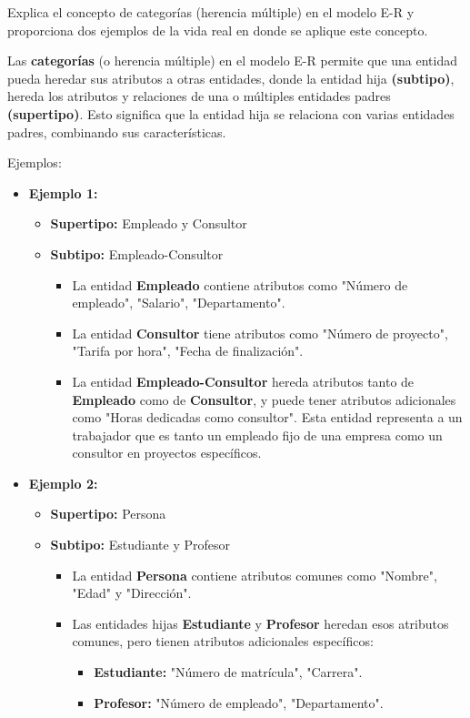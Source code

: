 
Explica el concepto de categorías (herencia múltiple) en el modelo E-R y proporciona dos ejemplos de la vida real en donde se aplique este concepto.

Las \textbf{categorías} (o herencia múltiple) en el modelo E-R permite que una entidad pueda heredar sus atributos a otras entidades, donde la entidad hija \textbf{(subtipo)}, hereda los atributos y relaciones de una o múltiples entidades padres \textbf{(supertipo)}. Esto significa que la entidad hija se relaciona con varias entidades padres, combinando sus características.

Ejemplos:
\begin{itemize}
    \item \textbf{Ejemplo 1:}
    \begin{itemize}
        \item \textbf{Supertipo: } Empleado y Consultor
        \item \textbf{Subtipo:} Empleado-Consultor
        
    \begin{itemize}
        \item La entidad \textbf{Empleado} contiene atributos como "Número de empleado", "Salario", "Departamento".
        \item La entidad \textbf{Consultor} tiene atributos como "Número de proyecto", "Tarifa por hora", "Fecha de finalización".
        \item La entidad \textbf{Empleado-Consultor} hereda atributos tanto de \textbf{Empleado} como de \textbf{Consultor}, y puede tener atributos adicionales como "Horas dedicadas como consultor". Esta entidad representa a un trabajador que es tanto un empleado fijo de una empresa como un consultor en proyectos específicos.
    \end{itemize}
    \end{itemize}

    \item \textbf{Ejemplo 2:}
    \begin{itemize}
         \item \textbf{Supertipo:} Persona
        \item \textbf{Subtipo:} Estudiante y Profesor
        
    \begin{itemize}
        \item La entidad \textbf{Persona} contiene atributos comunes como "Nombre", "Edad" y "Dirección".
        \item Las entidades hijas \textbf{Estudiante} y \textbf{Profesor} heredan esos atributos comunes, pero tienen atributos adicionales específicos:
        \begin{itemize}
            \item \textbf{Estudiante:} "Número de matrícula", "Carrera".
            \item \textbf{Profesor:} "Número de empleado", "Departamento".
        \end{itemize}
    \end{itemize}
    \end{itemize}
\end{itemize}
